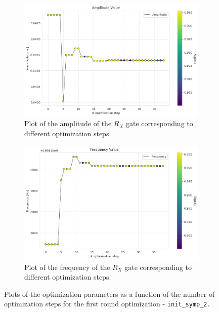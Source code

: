 \begin{figure}[htbp]
    \centering
    \begin{subfigure}[t]{0.45\textwidth}
        \includegraphics[width=\textwidth]{figures/png/RB_optimization/NM/InitialSymplex/20241113_181711/Amplitude.png}
        \caption{Plot of the amplitude of the $R_X$ gate corresponding to different optimization steps.}
        \label{fig:20241113_181711:amplitude}
    \end{subfigure}
    \hfill
    \begin{subfigure}[t]{0.45\textwidth}
        \includegraphics[width=\textwidth]{figures/png/RB_optimization/NM/InitialSymplex/20241113_181711/Frequency.png}
        \caption{Plot of the frequency of the $R_X$ gate corresponding to different optimization steps.}
        \label{fig:20241113_181711:frequency}
    \end{subfigure}
    \caption{Plots of the optimization parameters as a function of the number of optimization steps for the first round optimization - \tt{init\_symp\_2}.}
    \label{fig:20241113_181711:parameters}
\end{figure}

